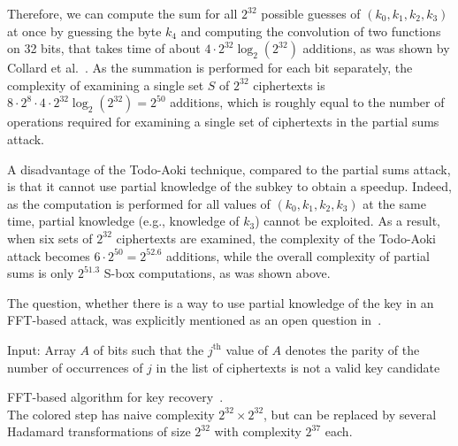 Therefore, we can compute the sum for all $2^{32}$ possible guesses of $(k_0,k_1,k_2,k_3)$ at once by guessing the byte $k_4$ and computing the convolution of two functions on 32 bits, that takes time of about $4 \cdot 2^{32} \log_2(2^{32})$ additions, as was shown by Collard et al.~\cite{ICISC:CollardSQ07}. As the summation is performed for each bit separately, the complexity of examining a single set $S$ of $2^{32}$ ciphertexts is $8 \cdot 2^8 \cdot 4 \cdot 2^{32} \log_2(2^{32}) = 2^{50}$ additions, which is roughly equal to the number of operations required for examining a single set of ciphertexts in the partial sums attack.

A disadvantage of the Todo-Aoki technique, compared to the partial sums attack, is that it cannot use partial knowledge of the subkey to obtain a speedup. Indeed, as the computation is performed for all values of $(k_0,k_1,k_2,k_3)$ at the same time, partial knowledge (e.g., knowledge of $k_3$) cannot be exploited. As a result, when six sets of $2^{32}$ ciphertexts are examined, the complexity of the Todo-Aoki attack becomes $6 \cdot 2^{50}=2^{52.6}$ additions, while the overall complexity of partial sums is only $2^{51.3}$ S-box computations, as was shown above.

The question, whether there is a way to use partial knowledge of the key in an FFT-based attack, was explicitly mentioned as an open question in~\cite{CANS:TodAok14}.

\begin{algorithm}[tb!]
    \begin{algorithmic}[1] %
        \State Input: Array $A$ of bits such that the $j^{\text{th}}$ value of $A$ denotes the parity of the number of occurrences of $j$ in the list of ciphertexts
                          is not a valid key candidate
                     \EndIf
                \EndFor
            \EndFor
    \end{algorithmic}
\caption{FFT-based algorithm for key recovery~\cite{CANS:TodAok14}.\\
The  colored step has naive complexity $2^{32}\times2^{32}$, but can be replaced by several Hadamard transformations of size $2^{32}$ with complexity $2^{37}$ each.\label{alg:fht-todo}}
\end{algorithm}


